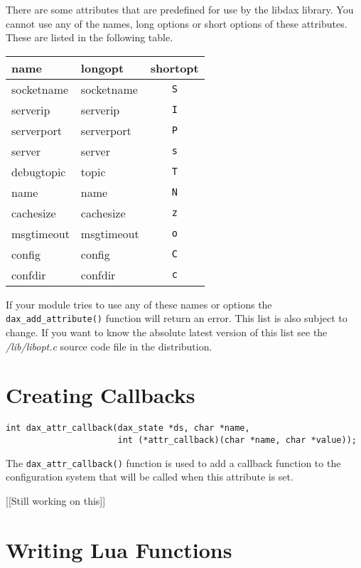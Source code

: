 There are some attributes that are predefined for use by the libdax library.
You cannot use any of the names, long options or short options of these
attributes.  These are listed in the following table.

\begin{tabular}{|l|l|c|}
\hline \textbf{name} & \textbf{longopt} & \textbf{shortopt} \\
\hline socketname & socketname & \texttt{S} \\
\hline serverip & serverip & \texttt{I} \\
\hline serverport & serverport & \texttt{P} \\
\hline server & server & \texttt{s} \\
\hline debugtopic & topic & \texttt{T} \\
\hline name & name & \texttt{N} \\
\hline cachesize & cachesize & \texttt{z} \\
\hline msgtimeout & msgtimeout & \texttt{o} \\
\hline config\footnotemark & config & \texttt{C} \\
\hline confdir\footnotemark[\value{footnote}] & confdir & \texttt{c} \\
\hline
\end{tabular}

If your module tries to use any of these names or options the
\verb|dax_add_attribute()| function will return an error.  This list is also
subject to change.  If you want to know the absolute latest version of this list
see the \textit{/lib/libopt.c} source code file in the \opendax distribution.

\section{Creating Callbacks}
\begin{verbatim}
int dax_attr_callback(dax_state *ds, char *name,
                      int (*attr_callback)(char *name, char *value));
\end{verbatim}

The \verb|dax_attr_callback()| function is
used to add a callback function to the configuration system that will be called
when this attribute is set.

[[Still working on this]]

\section{Writing Lua Functions}

